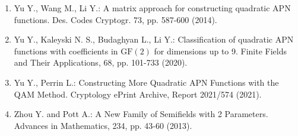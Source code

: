 \documentclass[10pt]{article}
\begin{document}
\begin{enumerate}
  \item Yu Y., Wang M., Li Y.: A matrix approach for constructing quadratic APN functions. Des. Codes Cryptogr. 73, pp. 587-600 (2014).
  \item Yu Y., Kaleyski N. S., Budaghyan L., Li Y.: Classification of quadratic APN functions with coefficients in $\mathrm{GF}(2)$ for dimensions up to 9. Finite Fields and Their Applications, 68, pp. 101-733 (2020).
  \item Yu Y., Perrin L.: Constructing More Quadratic APN Functions with the QAM Method. Cryptology ePrint Archive, Report 2021/574 (2021).
  \item Zhou Y. and Pott A.: A New Family of Semifields with 2 Parameters. Advances in Mathematics, 234, pp. 43-60 (2013).
\end{enumerate}
\end{document}
